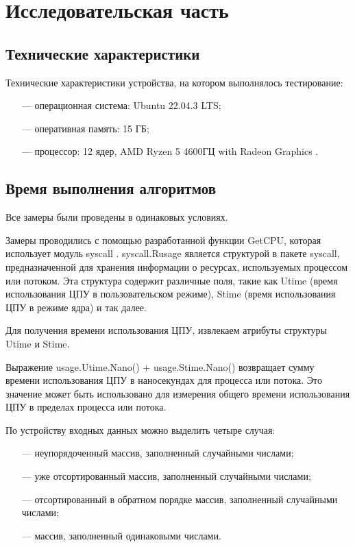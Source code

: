 \chapter{Исследовательская часть}

\section{Технические характеристики}

Технические характеристики устройства, на котором выполнялось тестирование:

\begin{itemize}
	\item[---] операционная система: Ubuntu \cite{ubuntu} 22.04.3 LTS;
	\item[---] оперативная память: 15 ГБ;
	\item[---] процессор: 12 ядер, AMD Ryzen 5 4600ГЦ with Radeon Graphics \cite{amd}.
\end{itemize}


\section{Время выполнения алгоритмов}
Все замеры были проведены в одинаковых условиях.

Замеры проводились с помощью разработанной функции GetCPU, которая использует модуль syscall \cite{syscall}. syscall.Rusage является структурой в пакете syscall, предназначенной для хранения информации о ресурсах, используемых процессом или потоком. Эта структура содержит различные поля, такие как Utime (время использования ЦПУ в пользовательском режиме), Stime (время использования ЦПУ в режиме ядра) и так далее.

Для получения времени использования ЦПУ, извлекаем атрибуты структуры Utime и Stime.

Выражение usage.Utime.Nano() + usage.Stime.Nano() возвращает сумму времени использования ЦПУ в наносекундах для процесса или потока. Это значение может быть использовано для измерения общего времени использования ЦПУ в пределах процесса или потока.

По устройству входных данных можно выделить четыре случая:
\begin{itemize}
	\item[---] неупорядоченный массив, заполненный случайными числами;
	\item[---] уже отсортированный массив, заполненный случайными числами;
	\item[---] отсортированный в обратном порядке массив, заполненный случайными числами;
	\item[---] массив, заполненный одинаковыми числами.
\end{itemize}


